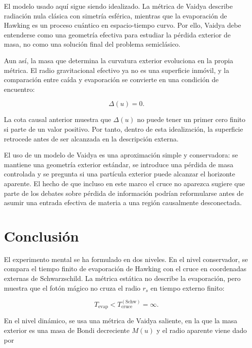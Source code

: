 \documentclass[
aps,
prd,
reprint,
superscriptaddress,
nofootinbib,
amsmath,
amssymb
]{revtex4-2}
\begin{document}
El modelo usado aquí sigue siendo idealizado. La métrica de Vaidya describe radiación nula clásica con simetría esférica, mientras que la evaporación de Hawking es un proceso cuántico en espacio-tiempo curvo. Por ello, Vaidya debe entenderse como una geometría efectiva para estudiar la pérdida exterior de masa, no como una solución final del problema semiclásico.

Aun así, la masa que determina la curvatura exterior evoluciona en la propia métrica. El radio gravitacional efectivo ya no es una superficie inmóvil, y la comparación entre caída y evaporación se convierte en una condición de encuentro:

\begin{equation}
\Delta(u)=0.
\end{equation}

La cota causal anterior muestra que $\Delta(u)$ no puede tener un primer cero finito si parte de un valor positivo. Por tanto, dentro de esta idealización, la superficie retrocede antes de ser alcanzada en la descripción externa.

El uso de un modelo de Vaidya es una aproximación simple y conservadora: se mantiene una geometría exterior estándar, se introduce una pérdida de masa controlada y se pregunta si una partícula exterior puede alcanzar el horizonte aparente. El hecho de que incluso en este marco el cruce no aparezca sugiere que parte de los debates sobre pérdida de información podrían reformularse antes de asumir una entrada efectiva de materia a una región causalmente desconectada.

\section{Conclusión}

El experimento mental se ha formulado en dos niveles. En el nivel conservador, se compara el tiempo finito de evaporación de Hawking con el cruce en coordenadas externas de Schwarzschild. La métrica estática no describe la evaporación, pero muestra que el fotón mágico no cruza el radio $r_s$ en tiempo externo finito:

\begin{equation}
T_{\mathrm{evap}}
<
T_{\mathrm{cruce}}^{(\mathrm{Schw})}
=
\infty.
\end{equation}

En el nivel dinámico, se usa una métrica de Vaidya saliente, en la que la masa exterior es una masa de Bondi decreciente $M(u)$ y el radio aparente viene dado por
\end{document}
